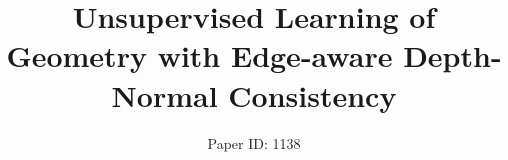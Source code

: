 \documentclass[letterpaper]{article}
\begin{document}
\title{Unsupervised Learning of Geometry with Edge-aware Depth-Normal Consistency}
\author{Paper ID: 1138}
\maketitle






% 





\newpage



\end{document}
